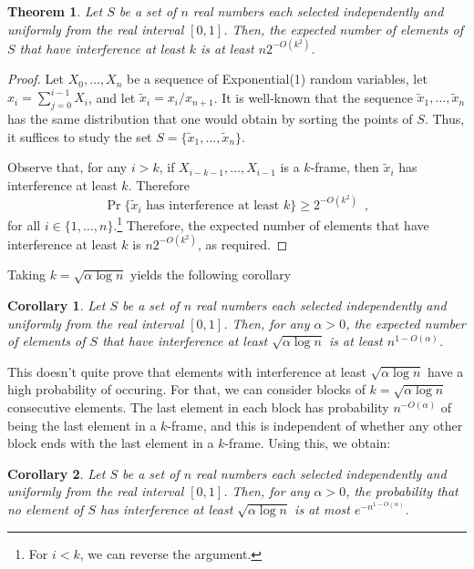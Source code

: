 \documentclass{article}
\newtheorem{thm}{Theorem}
\newtheorem{cor}{Corollary}
\begin{document}
\begin{thm}
Let $S$ be a set of $n$ real numbers each selected independently
and uniformly from the real interval $[0,1]$.
Then, the expected number of elements of $S$ that have interference at least
$k$ is at least $n2^{-O(k^2)}$.
\end{thm}

\begin{proof}
Let $X_0,\ldots,X_n$ be a sequence of Exponential(1) random variables,
let $x_i=\sum_{j=0}^{i-1} X_i$, and let $\tilde x_i = x_i/x_{n+1}$.
It is well-known that the sequence $\tilde x_1,\ldots,\tilde x_n$ has
the same distribution that one would obtain by sorting the points of $S$.
Thus, it suffices to study the set $S=\{\tilde x_1,\ldots,\tilde x_n\}$.

Observe that, for any $i > k$, if $X_{i-k-1},\ldots,X_{i-1}$ is a
$k$-frame, then $\tilde x_i$ has interference at least $k$.
Therefore
\[
  \Pr\{\mbox{$\tilde x_i$ has interference at least $k$}\} \ge 2^{-O(k^2)}
    \enspace ,
\]
for all $i\in\{1,\ldots,n\}$.\footnote{For $i <k$, we can reverse the
argument.}
Therefore, the expected number of elements that have interference at least
$k$ is $n2^{-O(k^2)}$, as required.
\end{proof}

Taking $k=\sqrt{\alpha\log n}$ yields the following corollary
\begin{cor}
Let $S$ be a set of $n$ real numbers each selected independently and
uniformly from the real interval $[0,1]$.  Then, for any $\alpha > 0$,
the expected number of elements of $S$ that have interference at least
$\sqrt{\alpha\log n}$ is at least $n^{1-O(\alpha)}$.
\end{cor}

This doesn't quite prove that elements with interference at least
$\sqrt{\alpha\log n}$ have a high probability of occuring.  For that, we
can consider blocks of $k=\sqrt{\alpha\log n}$ consecutive elements.  The
last element in each block has probability $n^{-O(\alpha)}$ of being the
last element in a $k$-frame, and this is independent of whether any other
block ends with the last element in a $k$-frame.  Using this, we obtain:

\begin{cor}
Let $S$ be a set of $n$ real numbers each selected independently and
uniformly from the real interval $[0,1]$.  Then, for any $\alpha > 0$,
the probability that no element of $S$ has interference at
least $\sqrt{\alpha\log n}$ is at most $e^{-n^{1-O(\alpha)}}$.
\end{cor}
\end{document}
